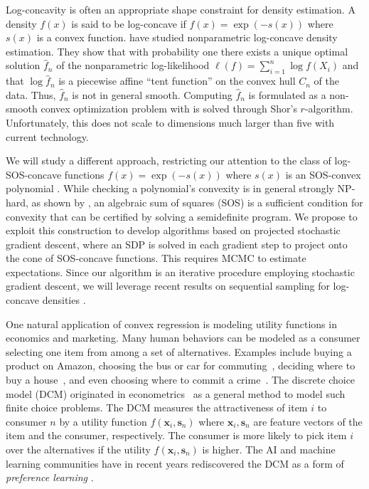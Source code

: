  Log-concavity is often an
appropriate shape constraint for density estimation.  A density $f(x)$
is said to be log-concave if $f(x) = \exp(-s(x))$ where $s(x)$ is a
convex function.  \cite{Cule:10} have studied nonparametric
log-concave density estimation.  They show that with probability one
there exists a unique optimal solution $\hat f_n$ of the nonparametric
log-likelihood $\ell(f) = \sum_{i=1}^n \log f(X_i)$ and that $\log\hat
f_n$ is a piecewise affine ``tent function'' on the convex hull $C_n$
of the data.  Thus, $\hat f_n$ is not in general smooth.  Computing
$\hat f_n$ is formulated as a non-smooth convex optimization problem
with is solved through Shor's $r$-algorithm. Unfortunately, this does not scale to
dimensions much larger than five with current technology.

We will study a different approach, restricting our attention
to the class of log-SOS-concave functions $f(x) = \exp(-s(x))$ where
$s(x)$ is an SOS-convex polynomial 
\citep{lasserre:09}.  While checking a polynomial's convexity is
in general strongly NP-hard, as shown by \cite{ahmadi:13},
an algebraic sum of squares (SOS) is a sufficient condition 
for convexity that can be certified by solving a semidefinite program.
We propose to exploit this construction to develop algorithms
based on projected stochastic gradient descent, where
an SDP is solved in each gradient step to project onto 
the cone of SOS-concave functions.  This requires
MCMC to estimate expectations.  
Since our algorithm is an iterative procedure
employing stochastic gradient descent, we will
leverage recent results on sequential sampling for log-concave
densities \citep{Narayanan:13}.




One natural application of convex regression is modeling
utility functions in economics and marketing.
Many human behaviors can be modeled as a consumer selecting one item
from among a set of alternatives.  Examples include buying a product
on Amazon, choosing the bus or car for
commuting~\citep{ortuzar1994modelling}, deciding where to buy a
house~\citep{nechyba1998community}, and even choosing where to commit
a crime~\citep{bernasco2009offenders}. The discrete choice model (DCM)
originated in econometrics~\citep{mcfadden1973conditional} as a
general method to model such finite choice problems. The DCM measures
the attractiveness of item $i$ to consumer $n$ by a utility function
$f(\mathbf{x}_i, \mathbf{s}_n)$ where $\mathbf{x}_i, \mathbf{s}_n$ are
feature vectors of the item and the consumer, respectively. The
consumer is more likely to pick item $i$ over the alternatives if the
utility $f(\mathbf{x}_i, \mathbf{s}_n)$ is higher. The AI and machine
learning communities have in recent years rediscovered the DCM as a
form of \emph{preference learning} \citep{furnkranz2010preference,
  chu2005preference}.

